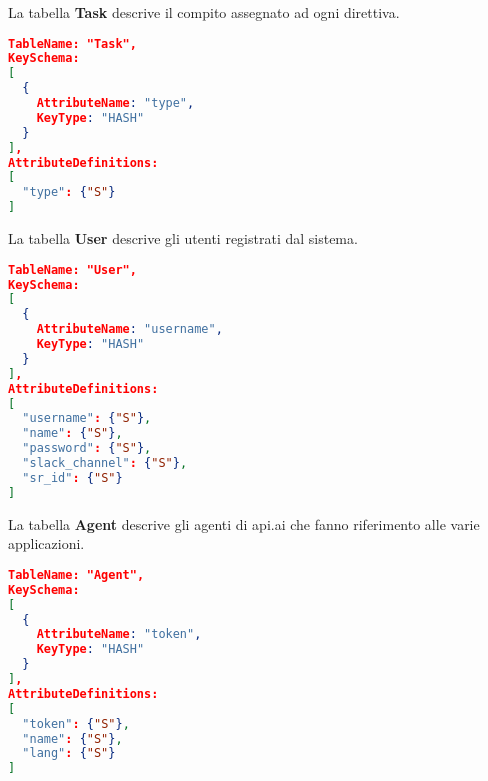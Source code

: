 La tabella \textbf{Task} descrive il compito assegnato ad ogni direttiva.
\begin{lstlisting}[language=json,firstnumber=1]
TableName: "Task",
KeySchema: 
[
  {
    AttributeName: "type",
    KeyType: "HASH"	
  }
],
AttributeDefinitions: 
[
  "type": {"S"}
]
\end{lstlisting}
\newpage
La tabella \textbf{User} descrive gli utenti registrati dal sistema. 
\begin{lstlisting}[language=json,firstnumber=1]
TableName: "User",
KeySchema: 
[
  {
    AttributeName: "username",
    KeyType: "HASH"
  }	
],
AttributeDefinitions: 
[
  "username": {"S"},
  "name": {"S"},
  "password": {"S"},
  "slack_channel": {"S"},
  "sr_id": {"S"}
]
\end{lstlisting}

La tabella \textbf{Agent} descrive gli agenti di api.ai che fanno riferimento alle varie applicazioni.
\begin{lstlisting}[language=json,firstnumber=1]
TableName: "Agent",
KeySchema:
[
  {
    AttributeName: "token",
    KeyType: "HASH"
  }	
],
AttributeDefinitions: 
[
  "token": {"S"},
  "name": {"S"},
  "lang": {"S"}
]
\end{lstlisting}